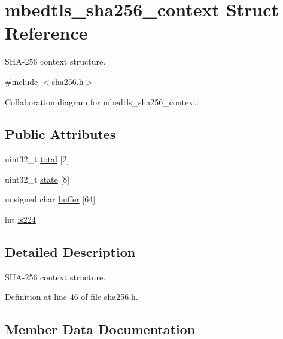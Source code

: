 \hypertarget{structmbedtls__sha256__context}{}\section{mbedtls\+\_\+sha256\+\_\+context Struct Reference}
\label{structmbedtls__sha256__context}


S\+H\+A-\/256 context structure.  




{\ttfamily \#include $<$sha256.\+h$>$}



Collaboration diagram for mbedtls\+\_\+sha256\+\_\+context\+:
\subsection*{Public Attributes}
\begin{DoxyCompactItemize}
\item 
uint32\+\_\+t \mbox{\hyperlink{structmbedtls__sha256__context_ab7444610a95153450180924862b2a0fa}{total}} \mbox{[}2\mbox{]}
\item 
uint32\+\_\+t \mbox{\hyperlink{structmbedtls__sha256__context_a88df25a0934134bd8b686152ba763322}{state}} \mbox{[}8\mbox{]}
\item 
unsigned char \mbox{\hyperlink{structmbedtls__sha256__context_adb4c87a904e9d4099592c5bf7ff0b308}{buffer}} \mbox{[}64\mbox{]}
\item 
int \mbox{\hyperlink{structmbedtls__sha256__context_ac73158ffb252c4bd2ccb991653619cc1}{is224}}
\end{DoxyCompactItemize}


\subsection{Detailed Description}
S\+H\+A-\/256 context structure. 

Definition at line 46 of file sha256.\+h.



\subsection{Member Data Documentation}
\mbox{\label{structmbedtls__sha256__context_adb4c87a904e9d4099592c5bf7ff0b308}} 
